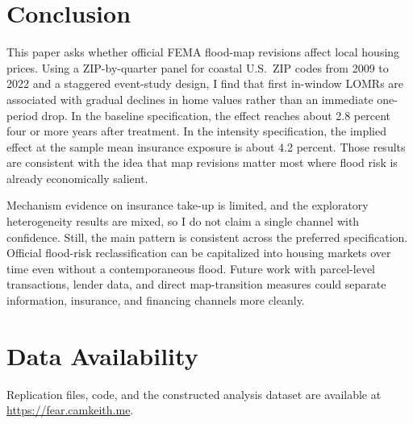 \documentclass[12pt]{article}
\begin{document}
\section{Conclusion}\label{sec:conclusion}

This paper asks whether official FEMA flood-map revisions affect local housing prices. Using a ZIP-by-quarter panel for coastal U.S.\ ZIP codes from 2009 to 2022 and a staggered event-study design, I find that first in-window LOMRs are associated with gradual declines in home values rather than an immediate one-period drop. In the baseline specification, the effect reaches about 2.8 percent four or more years after treatment. In the intensity specification, the implied effect at the sample mean insurance exposure is about 4.2 percent. Those results are consistent with the idea that map revisions matter most where flood risk is already economically salient.

Mechanism evidence on insurance take-up is limited, and the exploratory heterogeneity results are mixed, so I do not claim a single channel with confidence. Still, the main pattern is consistent across the preferred specification. Official flood-risk reclassification can be capitalized into housing markets over time even without a contemporaneous flood. Future work with parcel-level transactions, lender data, and direct map-transition measures could separate information, insurance, and financing channels more cleanly.


\section*{Data Availability}
Replication files, code, and the constructed analysis dataset are available at \newline \url{https://fear.camkeith.me}.


\newpage
\singlespacing



\newpage
\appendix
\renewcommand{\thetable}{A\arabic{table}}
\setcounter{table}{0}
\renewcommand{\thefigure}{A\arabic{figure}}
\setcounter{figure}{0}
\end{document}
